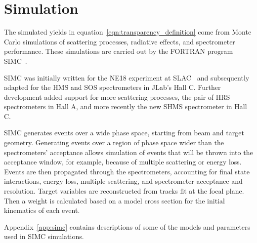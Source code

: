 \section{Simulation}
The simulated yields in equation~\ref{eqn:transparency_definition} come from
Monte Carlo simulations of scattering processes, radiative effects,
and spectrometer performance.
These simulations are carried out by the FORTRAN program
SIMC~\cite{simc_github, simc_wiki}.


SIMC was initially written for the NE18 experiment at
SLAC~\cite{Makins_1994} and subsequently adapted for the HMS and SOS
spectrometers in JLab's Hall C.
Further development added support for more scattering processes, the pair of
HRS spectrometers in Hall A, and more recently the new SHMS spectrometer in
Hall C.


SIMC generates events over a wide phase space, starting from beam and
target geometry.
Generating events over a region of phase space wider than the spectrometers'
acceptance allows simulation of events that will be thrown into the acceptance
window, for example, because of multiple scattering or energy loss.
Events are then propagated through the spectrometers, accounting for final
state interactions, energy loss, multiple scattering, and spectrometer
acceptance and resolution.
Target variables are reconstructed from tracks fit at the focal plane.
Then a weight is calculated based on a model cross section for the initial
kinematics of each event.


Appendix~\ref{app:simc} contains descriptions of some of the models and
 parameters used in SIMC simulations.
